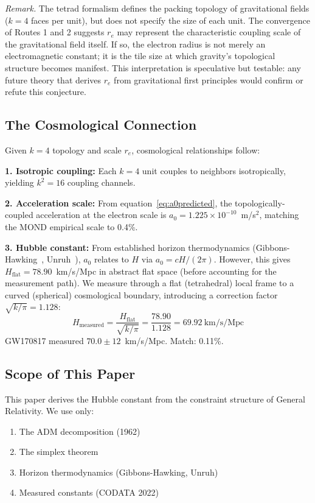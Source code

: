 \documentclass[aps,prd,preprint,superscriptaddress,showpacs,preprintnumbers,amsmath,amssymb,nofootinbib]{revtex4-2}
\begin{document}
\emph{Remark.} The tetrad formalism defines the packing topology of gravitational fields ($k=4$ faces per unit), but does not specify the size of each unit. The convergence of Routes 1 and 2 suggests $r_e$ may represent the characteristic coupling scale of the gravitational field itself. If so, the electron radius is not merely an electromagnetic constant; it is the tile size at which gravity's topological structure becomes manifest. This interpretation is speculative but testable: any future theory that derives $r_e$ from gravitational first principles would confirm or refute this conjecture.

\subsection{The Cosmological Connection}
\label{subsec:cosmo}

Given $k=4$ topology and scale $r_e$, cosmological relationships follow:

\textbf{1. Isotropic coupling:} Each $k=4$ unit couples to neighbors isotropically, yielding $k^2 = 16$ coupling channels.

\textbf{2. Acceleration scale:} From equation~\eqref{eq:a0predicted}, the topologically-coupled acceleration at the electron scale is $a_0 = 1.225 \times 10^{-10}$~m/s$^2$, matching the MOND empirical scale to 0.4\%.

\textbf{3. Hubble constant:} From established horizon thermodynamics (Gibbons-Hawking~\cite{gibbons1977}, Unruh~\cite{unruh1976}), $a_0$ relates to $H$ via $a_0 = cH/(2\pi)$. However, this gives $H_{\text{flat}} = 78.90$~km/s/Mpc in abstract flat space (before accounting for the measurement path). We measure through a flat (tetrahedral) local frame to a curved (spherical) cosmological boundary, introducing a correction factor $\sqrt{k/\pi} = 1.128$:
\begin{equation}
H_{\text{measured}} = \frac{H_{\text{flat}}}{\sqrt{k/\pi}} = \frac{78.90}{1.128} = 69.92~\text{km/s/Mpc}
\end{equation}
GW170817 measured $70.0 \pm 12$~km/s/Mpc. Match: 0.11\%.

\subsection{Scope of This Paper}
\label{subsec:scope}

This paper derives the Hubble constant from the constraint structure of General Relativity. We use only:
\begin{enumerate}
\item The ADM decomposition (1962)
\item The simplex theorem
\item Horizon thermodynamics (Gibbons-Hawking, Unruh)
\item Measured constants (CODATA 2022)
\end{enumerate}
\end{document}
